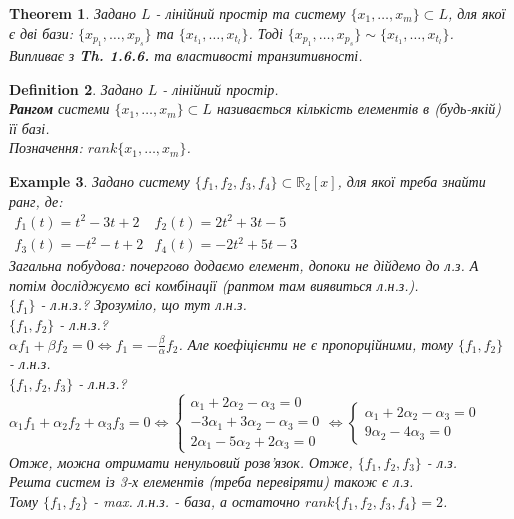 \documentclass[a4paper, 10pt]{article}
\def\huge{\displaystyle}
\theoremstyle{theoremdd}
\newtheorem{theorem}{Theorem}[subsection]
\theoremstyle{theoremdd}
\newtheorem{definition}[theorem]{Definition}
\theoremstyle{theoremdd}
\theoremstyle{theoremdd}
\newtheorem{example}[theorem]{Example}
\theoremstyle{theoremdd}
\theoremstyle{theoremdd}
\theoremstyle{theoremdd}
\theoremstyle{theoremdd}
\begin{document}
	\begin{theorem}
	Задано $L$ - лінійний простір та систему $\{x_1, \dots, x_m\} \subset L$, для якої є дві бази: $\{x_{p_1}, \dots, x_{p_s}\}$ та $\{x_{t_1}, \dots, x_{t_l}\}$. Тоді
	$\{x_{p_1}, \dots, x_{p_s}\} \sim \{x_{t_1}, \dots, x_{t_l}\}$.\\
	\textit{Випливає з} \textbf{Th. 1.6.6.} \textit{та властивості транзитивності.}
	\end{theorem}
	
	\begin{definition}
	Задано $L$ - лінійний простір.\\
	\textbf{Рангом} системи $\{x_1, \dots, x_m\} \subset L$ називається кількість елементів в (будь-якій) її базі.\\
	Позначення: $rank\{x_1, \dots, x_m\}$.
	\end{definition}
	
	\begin{example}
	Задано систему $\{f_1, f_2, f_3, f_4\} \subset \mathbb{R}_2[x]$, для якої треба знайти ранг, де:\\
	$\begin{matrix}
	f_1(t) = t^2-3t+2 & f_2(t) = 2t^2+3t-5 \\
	f_3(t) = -t^2-t+2 & f_4(t) = -2t^2+5t-3
	\end{matrix}
	$\\
	Загальна побудова: почергово додаємо елемент, допоки не дійдемо до л.з. А потім досліджуємо всі комбінації (раптом там виявиться л.н.з.).\\
	$\{f_1\}$ - л.н.з.? Зрозуміло, що тут л.н.з.\\
	$\{f_1, f_2 \}$ - л.н.з.? \\ $\alpha f_1 + \beta f_2 = 0 \iff \huge f_1 = -\frac{\beta}{\alpha}f_2$. Але коефіцієнти не є пропорційними, тому $\{f_1, f_2\}$ - л.н.з.\\
	$\{f_1, f_2, f_3\}$ - л.н.з.? \\
	$\alpha_1 f_1 + \alpha_2 f_2 + \alpha_3 f_3 = 0 \iff 
	\begin{cases}
	\alpha_1 + 2\alpha_2 - \alpha_3 = 0 \\
	-3\alpha_1 + 3\alpha_2 - \alpha_3 = 0 \\
	2\alpha_1 - 5\alpha_2 + 2\alpha_3 = 0
	\end{cases} \iff
	\begin{cases}
	\alpha_1 + 2\alpha_2 - \alpha_3 = 0 \\
	9\alpha_2 - 4\alpha_3 = 0
	\end{cases}
	$\\
	Отже, можна отримати ненульовий розв'язок. Отже, $\{f_1, f_2, f_3\}$ - л.з.\\
	Решта систем із 3-х елементів (треба перевіряти) також є л.з.\\
	Тому $\{f_1, f_2\}$ - max. л.н.з. - база, а остаточно $rank\{f_1, f_2, f_3, f_4 \} = 2$.
	\end{example}
	
\end{document}
